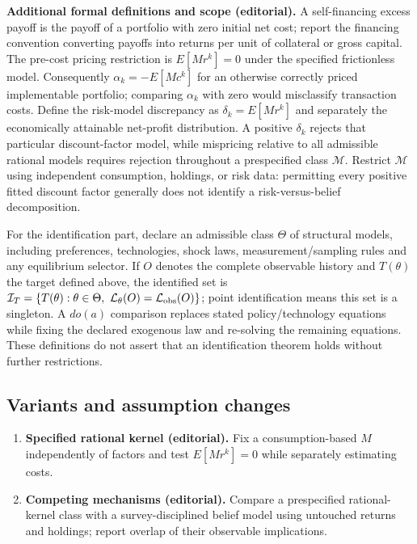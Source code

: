\documentclass[11pt,a4paper]{article}
\begin{document}
\textbf{Additional formal definitions and scope (editorial).} A self-financing excess payoff is the payoff of a portfolio with zero initial net cost; report the financing convention converting payoffs into returns per unit of collateral or gross capital. The pre-cost pricing restriction is \(E[M r^k]=0\) under the specified frictionless model. Consequently \(\alpha_k=-E[M c^k]\) for an otherwise correctly priced implementable portfolio; comparing \(\alpha_k\) with zero would misclassify transaction costs. Define the risk-model discrepancy as \(\delta_k=E[M r^k]\) and separately the economically attainable net-profit distribution. A positive \(\delta_k\) rejects that particular discount-factor model, while mispricing relative to all admissible rational models requires rejection throughout a prespecified class \(\mathcal M\). Restrict \(\mathcal M\) using independent consumption, holdings, or risk data: permitting every positive fitted discount factor generally does not identify a risk-versus-belief decomposition.

For the identification part, declare an admissible class \(\Theta\) of structural models, including preferences, technologies, shock laws, measurement/sampling rules and any equilibrium selector. If \(O\) denotes the complete observable history and \(T(\theta)\) the target defined above, the identified set is \(\mathcal I_T=\{T(\theta):\theta\in\Theta,\ \mathcal L_\theta(O)=\mathcal L_{\rm obs}(O)\}\); point identification means this set is a singleton. A \(do(a)\) comparison replaces stated policy/technology equations while fixing the declared exogenous law and re-solving the remaining equations. These definitions do not assert that an identification theorem holds without further restrictions.
\subsection*{Variants and assumption changes}
\begin{enumerate}
\item \textbf{Specified rational kernel (editorial).} Fix a consumption-based \(M\) independently of factors and test \(E[Mr^k]=0\) while separately estimating costs.
\item \textbf{Competing mechanisms (editorial).} Compare a prespecified rational-kernel class with a survey-disciplined belief model using untouched returns and holdings; report overlap of their observable implications.
\end{enumerate}
\end{document}
